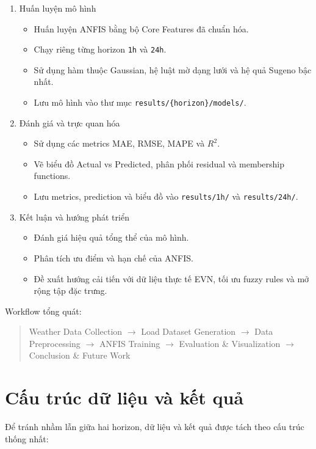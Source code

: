 \begin{enumerate}[leftmargin=1.2cm]
  \item Huấn luyện mô hình
  \begin{itemize}
    \item Huấn luyện ANFIS bằng bộ Core Features đã chuẩn hóa.
    \item Chạy riêng từng horizon \texttt{1h} và \texttt{24h}.
    \item Sử dụng hàm thuộc Gaussian, hệ luật mờ dạng lưới và hệ quả Sugeno bậc nhất.
    \item Lưu mô hình vào thư mục \texttt{results/\{horizon\}/models/}.
  \end{itemize}

  \item Đánh giá và trực quan hóa
  \begin{itemize}
    \item Sử dụng các metrics MAE, RMSE, MAPE và $R^2$.
    \item Vẽ biểu đồ Actual vs Predicted, phân phối residual và membership functions.
    \item Lưu metrics, prediction và biểu đồ vào \texttt{results/1h/} và \texttt{results/24h/}.
  \end{itemize}

  \item Kết luận và hướng phát triển
  \begin{itemize}
    \item Đánh giá hiệu quả tổng thể của mô hình.
    \item Phân tích ưu điểm và hạn chế của ANFIS.
    \item Đề xuất hướng cải tiến với dữ liệu thực tế EVN, tối ưu fuzzy rules và mở rộng tập đặc trưng.
  \end{itemize}
\end{enumerate}

Workflow tổng quát:
\begin{quote}
Weather Data Collection $\rightarrow$ Load Dataset Generation $\rightarrow$ Data Preprocessing $\rightarrow$ ANFIS Training $\rightarrow$ Evaluation \& Visualization $\rightarrow$ Conclusion \& Future Work
\end{quote}

\section{Cấu trúc dữ liệu và kết quả}

Để tránh nhầm lẫn giữa hai horizon, dữ liệu và kết quả được tách theo cấu trúc thống nhất:

